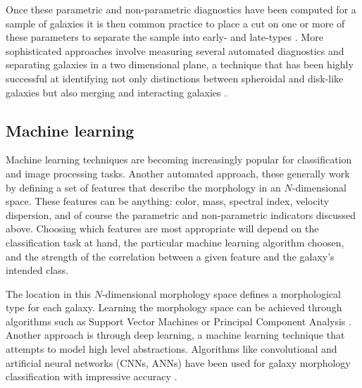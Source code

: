 Once these parametric and non-parametric diagnostics have been computed for a sample of galaxies it is then common practice to place a cut on one or more of these parameters to separate the sample into early- and late-types \citep{Shen2003}. More sophisticated approaches involve measuring several automated diagnostics and separating galaxies in a two dimensional plane, a technique that has been highly successful at identifying not only distinctions between spheroidal and disk-like galaxies but also merging and interacting galaxies \citep{Lotz2004, Lotz2006,Conselice2000, Conselice2003,Freeman2013}. 







\subsection{Machine learning}
Machine learning techniques are becoming increasingly popular for classification and image processing tasks. Another automated approach, these generally work by defining a set of features that describe the morphology in an $N$-dimensional space. These features can be anything: color, mass, spectral index, velocity dispersion, and of course the parametric and non-parametric indicators discussed above. Choosing which features are most appropriate will depend on the classification task at hand, the particular machine learning algorithm choosen, and the strength of the correlation between a given feature and the galaxy's intended class. 

The location in this $N$-dimensional morphology space defines a morphological type for each galaxy. Learning the morphology space can be achieved through algorithms such as Support Vector Machines \citep{HuertasCompany2008} or Principal Component Analysis \citep{Watanabe1985, Conselice2006, Scarlata2007, Peth2016}. Another approach is through deep learning, a machine learning technique that attempts to model high level abstractions. Algorithms like convolutional and artificial neural networks (CNNs, ANNs) have been used for galaxy morphology classification with impressive accuracy \citep{Ball2004, 	Banerji2010, Dieleman2015, HuertasCompany2015}. 

